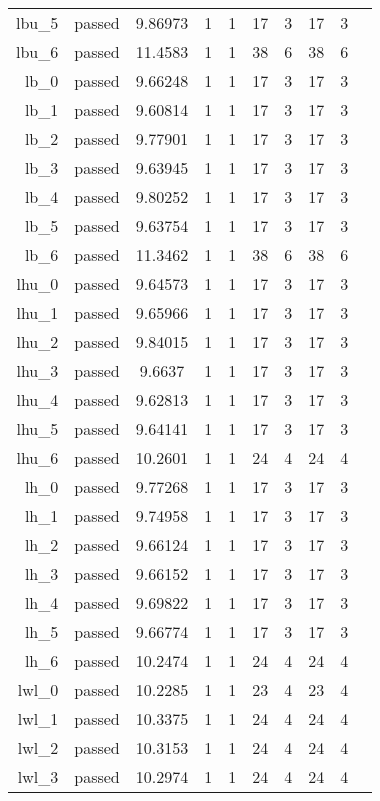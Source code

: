 \begin{longtable}{r|ccccccccc}
    lbu\_5 & passed & 9.86973 & 1 & 1 & 17 & 3 & 17 & 3 \\
    lbu\_6 & passed & 11.4583 & 1 & 1 & 38 & 6 & 38 & 6 \\
    lb\_0 & passed & 9.66248 & 1 & 1 & 17 & 3 & 17 & 3 \\
    lb\_1 & passed & 9.60814 & 1 & 1 & 17 & 3 & 17 & 3 \\
    lb\_2 & passed & 9.77901 & 1 & 1 & 17 & 3 & 17 & 3 \\
    lb\_3 & passed & 9.63945 & 1 & 1 & 17 & 3 & 17 & 3 \\
    lb\_4 & passed & 9.80252 & 1 & 1 & 17 & 3 & 17 & 3 \\
    lb\_5 & passed & 9.63754 & 1 & 1 & 17 & 3 & 17 & 3 \\
    lb\_6 & passed & 11.3462 & 1 & 1 & 38 & 6 & 38 & 6 \\
    lhu\_0 & passed & 9.64573 & 1 & 1 & 17 & 3 & 17 & 3 \\
    lhu\_1 & passed & 9.65966 & 1 & 1 & 17 & 3 & 17 & 3 \\
    lhu\_2 & passed & 9.84015 & 1 & 1 & 17 & 3 & 17 & 3 \\
    lhu\_3 & passed & 9.6637 & 1 & 1 & 17 & 3 & 17 & 3 \\
    lhu\_4 & passed & 9.62813 & 1 & 1 & 17 & 3 & 17 & 3 \\
    lhu\_5 & passed & 9.64141 & 1 & 1 & 17 & 3 & 17 & 3 \\
    lhu\_6 & passed & 10.2601 & 1 & 1 & 24 & 4 & 24 & 4 \\
    lh\_0 & passed & 9.77268 & 1 & 1 & 17 & 3 & 17 & 3 \\
    lh\_1 & passed & 9.74958 & 1 & 1 & 17 & 3 & 17 & 3 \\
    lh\_2 & passed & 9.66124 & 1 & 1 & 17 & 3 & 17 & 3 \\
    lh\_3 & passed & 9.66152 & 1 & 1 & 17 & 3 & 17 & 3 \\
    lh\_4 & passed & 9.69822 & 1 & 1 & 17 & 3 & 17 & 3 \\
    lh\_5 & passed & 9.66774 & 1 & 1 & 17 & 3 & 17 & 3 \\
    lh\_6 & passed & 10.2474 & 1 & 1 & 24 & 4 & 24 & 4 \\
    lwl\_0 & passed & 10.2285 & 1 & 1 & 23 & 4 & 23 & 4 \\
    lwl\_1 & passed & 10.3375 & 1 & 1 & 24 & 4 & 24 & 4 \\
    lwl\_2 & passed & 10.3153 & 1 & 1 & 24 & 4 & 24 & 4 \\
    lwl\_3 & passed & 10.2974 & 1 & 1 & 24 & 4 & 24 & 4 \\

\end{longtable}
